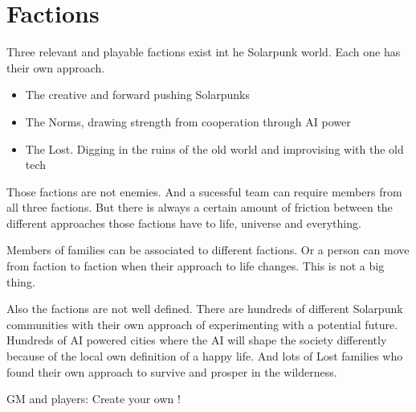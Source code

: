 \chapter{Factions}

Three relevant and playable factions exist int he Solarpunk world. Each one has their own approach. 

\begin{itemize}
    \item The creative and forward pushing Solarpunks
    \item The Norms, drawing strength from cooperation through AI power
    \item The Lost. Digging in the ruins of the old world and improvising with the old tech
\end{itemize}

Those factions are not enemies. And a sucessful team can require members from all three factions. But there is always a certain amount of friction between the different approaches those factions have to life, universe and everything.

Members of families can be associated to different factions. Or a person can move from faction to faction when their approach to life changes. This is not a big thing.

Also the factions are not well defined. There are hundreds of different Solarpunk communities with their own approach of experimenting with a potential future. Hundreds of AI powered cities where the AI will shape the society differently because of the local own definition of a happy life. And lots of Lost families who found their own approach to survive and prosper in the wilderness.

GM and players: Create your own !